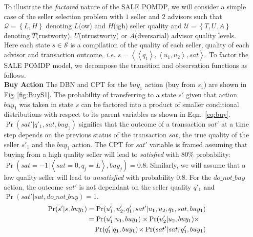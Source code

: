 \documentclass{aamas2013}
\providecommand{\SALEP}{SALE POMDP}
\begin{document}
To illustrate the \textit{factored} nature of the \SALEP{}, we will consider a simple case of the seller selection problem with $1$ seller and $2$ advisors such that $\mathcal{Q}=\left\{ L,H\right\} $ denoting $L$(ow) and $H$(igh) seller quality and $\mathcal{U}=\left\{ T,U, A\right\} $ denoting $T$(rustworty), $U$(ntrustworty) or $A$(dversarial) advisor quality levels. Here each state $s \in \mathcal{S}$ is a compilation of the quality of each seller, quality of each advisor and transaction outcome, \textit{i.e.} $s=\left\langle \left\langle q_1\right\rangle, \left\langle u_1, u_2\right\rangle, sat\right\rangle$. To factor the \SALEP{} model, we decompose the transition and observation functions as follows.\\
 \textbf{Buy Action} The DBN and CPT for the $buy_{1}$ action  (buy from $s_1$) are shown in Fig~\ref{fig:BuyS1}. The probability of transferring to a state $s'$ given that action $buy_{1}$ was taken in state $s$ can be factored into a product of smaller conditional distributions with respect to its parent variables as shown in Eqn.~\ref{eq:buy}.  $\Pr(sat'|q'_1,sat,buy_{1})$ signifies that the outcome of a transaction $sat'$ at a time step depends on the previous status of the transaction $sat$, the true quality of the seller $s'_1$ and the $buy_{1}$ action. The CPT for $sat'$ variable is framed assuming that buying from a high quality seller will lead to \emph{satisfied} with 80\% probability: $ \Pr(sat=-1|\left\langle sat=0,q_{j}=L\right\rangle ,buy_{j})=0.8$. Similarly, we will assume that a low quality seller will lead to \emph{unsatisfied} with probability $0.8$. For the $do\_not\_buy$ action, the outcome $sat'$ is not dependant on the seller quality $q'_1$ and $\Pr(sat'|sat,do\_not\_buy)=1$.\\
\vspace{-2mm}
 \begin{equation}
\begin{split}
\Pr(s'|s,buy_{1}) & = \Pr(u'_1,u'_2, q'_1,sat'|u_1,u_2,q_1,sat,buy_{1}) \\
& =  \Pr(u'_1|u_1,buy_{1})\times \Pr(u'_2|u_2,buy_{1}) \times \\
& \hspace{3.5mm}\Pr(q'_1|q_1,buy_{1}) \hspace{-0.5mm}\times\Pr(sat'|sat,q'_1,buy_{1})
\end{split}
 \label{eq:buy}
\end{equation}
\end{document}
